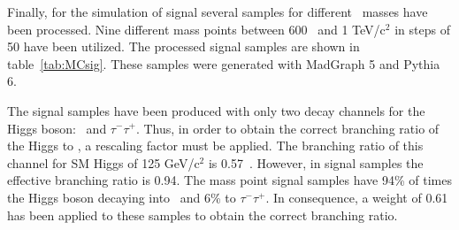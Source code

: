 Finally, for the simulation of signal several samples for different \Tp~masses have been processed. Nine different mass points between 600 \GeVcc~and 1 TeV/$\text{c}^{2}$ in steps of 50 \GeVcc have been utilized. The processed signal samples are shown in table~\ref{tab:MCsig}. These samples were generated with MadGraph 5 and Pythia 6.

\begin{table*}[htbH]
\begin{center}
\caption{List of Monte-Carlo signal samples used in the analysis, their corresponding cross-section and \Tp~mass.\label{tab:MCsig}}
\end{center}
\end{table*}

The signal samples have been produced with only two decay channels for the Higgs boson: \bbbar~and $\tau^{-}\tau^{+}$. Thus, in order to obtain the correct branching ratio of the Higgs to \bbbar, a rescaling factor must be applied. The branching ratio of this channel for SM Higgs of 125 GeV/$\text{c}^{2}$ is 0.57~\cite{Heinemeyer:2013tqa}. However, in signal samples the effective branching ratio is 0.94. The mass point signal samples have 94\% of times the Higgs boson decaying into \bbbar~and 6\% to $\tau^{-}\tau^{+}$. In consequence, a weight of 0.61 has been applied to these samples to obtain the correct branching ratio. %

